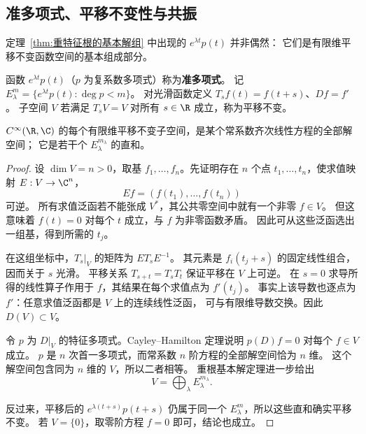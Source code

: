 \subsection*{准多项式、平移不变性与共振}
\label{sec:quasipolynomials}
定理~\ref{thm:重特征根的基本解组} 中出现的 $e^{\lambda t}p(t)$ 并非偶然：
它们是有限维平移不变函数空间的基本组成部分。
\begin{definition}
函数 $e^{\lambda t}p(t)$（$p$ 为复系数多项式）称为\textbf{准多项式}。
记 $E_\lambda^m=\{e^{\lambda t}p(t):\deg p<m\}$。
对光滑函数定义 $T_sf(t)=f(t+s)$、$Df=f'$。
子空间 $V$ 若满足 $T_sV=V$ 对所有 $s\in\R$ 成立，称为平移不变。
\end{definition}
\begin{theorem}\label{thm:arnold-translation}
$C^\infty(\R,\C)$ 的每个有限维平移不变子空间，是某个常系数齐次线性方程的全部解空间；
它是若干个 $E_\lambda^{m_\lambda}$ 的直和。
\end{theorem}
\begin{proof}
设 $\dim V=n>0$，取基 $f_1,\ldots,f_n$。先证明存在 $n$ 个点
$t_1,\ldots,t_n$，使求值映射
$E:V\to\C^n$，
\[
 Ef=(f(t_1),\ldots,f(t_n))
\]
 可逆。
所有求值泛函若不能张成 $V^*$，其公共零空间中就有一个非零 $f\in V$。
但这意味着 $f(t)=0$ 对每个 $t$ 成立，与 $f$ 为非零函数矛盾。
因此可从这些泛函选出一组基，得到所需的 $t_j$。

在这组坐标中，$T_s|_V$ 的矩阵为 $ET_sE^{-1}$。
其元素是 $f_i(t_j+s)$ 的固定线性组合，因而关于 $s$ 光滑。
平移关系 $T_{s+t}=T_sT_t$ 保证平移在 $V$ 上可逆。
在 $s=0$ 求导所得的线性算子作用于 $f$，其结果在每个求值点为 $f'(t_j)$。
事实上该导数也逐点为 $f'$：任意求值泛函都是 $V$ 上的连续线性泛函，
可与有限维导数交换。因此 $D(V)\subset V$。

令 $p$ 为 $D|_V$ 的特征多项式。Cayley--Hamilton 定理说明
$p(D)f=0$ 对每个 $f\in V$ 成立。
$p$ 是 $n$ 次首一多项式，而常系数 $n$ 阶方程的全部解空间恰为 $n$ 维。
这个解空间包含同为 $n$ 维的 $V$，所以二者相等。
重根基本解定理进一步给出
\[
 V=\bigoplus_\lambda E_\lambda^{m_\lambda}.
\]

反过来，平移后的 $e^{\lambda(t+s)}p(t+s)$ 仍属于同一个
$E_\lambda^m$，所以这些直和确实平移不变。
若 $V=\{0\}$，取零阶方程 $f=0$ 即可，结论也成立。
\end{proof}

